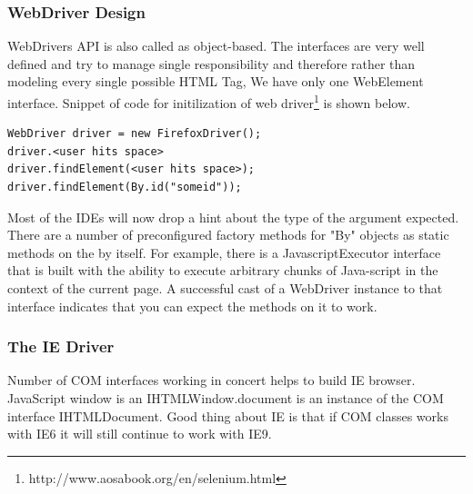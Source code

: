 \documentclass[article,type=msc,colorback,accentcolor=tud9c,twoside,11pt]{tudthesis}
\begin{document}
\subsubsection{WebDriver Design}
WebDrivers API \cite{SeleniumTestingFramework} is also called as  object-based. The interfaces are very well defined and try to manage single responsibility and therefore rather than modeling every single possible HTML Tag, We have only one WebElement interface. Snippet of code for initilization of web driver\footnote{http://www.aosabook.org/en/selenium.html} is shown below.
\begin{lstlisting}
WebDriver driver = new FirefoxDriver();
driver.<user hits space>
driver.findElement(<user hits space>);
driver.findElement(By.id("someid"));
\end{lstlisting}
Most of the IDEs will now drop a hint about the type of the argument expected. There are a number of preconfigured factory methods for "By" objects as static methods on the by itself. For example, there is a JavascriptExecutor interface that is built with the ability to execute arbitrary chunks of Java-script in the context of the current page. A successful cast of a WebDriver instance to that interface indicates that you can expect the methods on it to work.
\subsubsection{The IE Driver}
Number of COM interfaces working in concert helps to build IE browser. JavaScript window is an IHTMLWindow.document is an instance of the COM interface IHTMLDocument. Good thing about IE is that if COM classes works with IE6 it will still continue to work with IE9.
\end{document}

